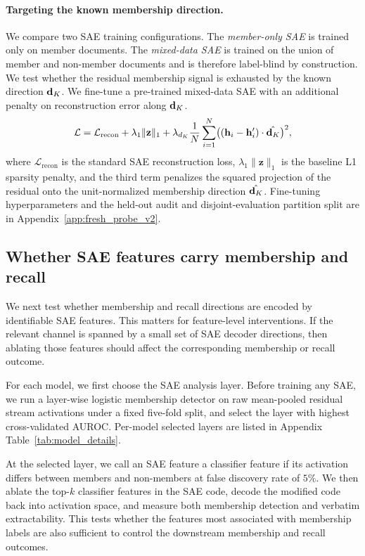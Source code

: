 \paragraph{Targeting the known membership direction.}
We compare two SAE training configurations. The \emph{member-only SAE} is trained only on member documents. The \emph{mixed-data SAE} is trained on the union of member and non-member documents and is therefore label-blind by construction. We test whether the residual membership signal is exhausted by the known direction $\mathbf{d}_K$. We fine-tune a pre-trained mixed-data SAE with an additional
penalty on reconstruction error along $\mathbf{d}_K$.
\begin{equation}
\mathcal{L} = \mathcal{L}_{\text{recon}} + \lambda_1 \|\mathbf{z}\|_1 + \lambda_{d_K} \frac{1}{N}\sum_{i=1}^{N} \bigl((\mathbf{h}_i - \mathbf{h}'_i)
\cdot \hat{\mathbf{d}_K}\bigr)^2,
\label{eq:dk_penalty}
\end{equation}
\noindent where $\mathcal{L}_{\text{recon}}$ is the standard SAE reconstruction loss, $\lambda_1 \|\mathbf{z}\|_1$ is the baseline L1 sparsity penalty, and the third
term penalizes the squared projection of the residual onto the unit-normalized membership direction $\hat{\mathbf{d}_K}$. Fine-tuning hyperparameters and the held-out audit and disjoint-evaluation partition split are in Appendix~\ref{app:fresh_probe_v2}.

\subsection{Whether SAE features carry membership and recall}
\label{sec:methods:ablation}

We next test whether membership and recall directions are encoded by identifiable SAE features. This matters for feature-level interventions. If the relevant channel is spanned by a small set of SAE decoder
directions, then ablating those features should affect the corresponding membership or recall outcome.

For each model, we first choose the SAE analysis layer. Before training any SAE, we run a layer-wise logistic membership detector on raw mean-pooled
residual stream activations under a fixed five-fold split, and select the layer with highest cross-validated AUROC. Per-model selected layers are listed
in Appendix Table~\ref{tab:model_details}.

At the selected layer, we call an SAE feature a classifier feature if its activation differs between members and non-members at false discovery
rate of $5\%$. We then ablate the top-$k$ classifier features in the SAE code, decode the modified code back into activation space, and measure both
membership detection and verbatim extractability. This tests whether the features most associated with membership labels are also sufficient to control
the downstream membership and recall outcomes.

